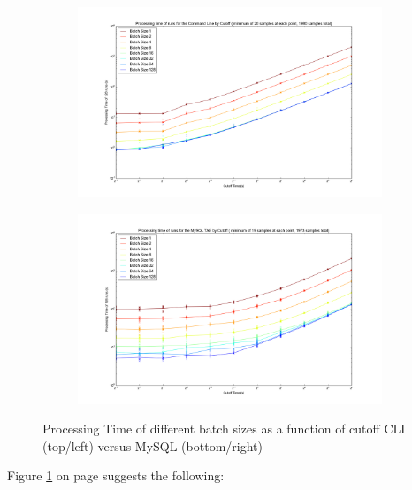 \documentclass[11pt,letterpaper,oneside]{article}
\begin{document}
\begin{figure}
\centering
\begin{subfigure}
  \centering
  \includegraphics[width=480px]{img/plots/processTimeVersusCutoffTime-cli}

\end{subfigure}%
\begin{subfigure}
  \centering
  \includegraphics[width=480px]{img/plots/processTimeVersusCutoffTime-mysql}
  
\end{subfigure}
\caption{Processing Time of different batch sizes as a function of cutoff CLI (top/left) versus MySQL (bottom/right)}
\label{processTimeVersusCutoffTime}
\end{figure}


Figure \ref{processTimeVersusCutoffTime} on page \pageref{processTimeVersusCutoffTime} suggests the following:
\end{document}
